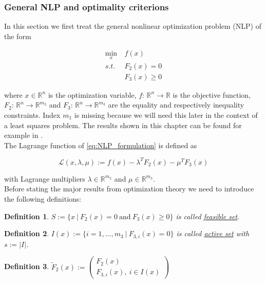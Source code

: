 \documentclass{scrartcl}[12pt, halfparskip]
\numberwithin{equation}{section}
\numberwithin{figure}{section}
\numberwithin{table}{section}
\newtheorem{Definition}{Definition}
\begin{document}
\subsubsection{General NLP and optimality criterions}
\label{sec:optimization_theory_NLP}
In this section we first treat the general nonlinear optimization problem (NLP) of the form

\begin{align}
	\min_x & \ f(x) \label{eq:NLP_formulation} \\
	s.t. & \ F_2(x) = 0 \nonumber \\
	& \ F_3(x) \ge 0 \nonumber
\end{align}

where $x \in \mathbb{R}^n$ is the optimization variable, $f\text{: } \mathbb{R}^n \rightarrow \mathbb{R}$ is the objective function, $F_2\text{: } \mathbb{R}^n \rightarrow \mathbb{R}^{m_2}$ and $F_3\text{: } \mathbb{R}^n \rightarrow \mathbb{R}^{m_3}$ are the equality and respectively inequality constraints. Index $m_1$ is missing because we will need this later in the context of a least squares problem. The results shown in this chapter can be found for example in \cite{nonlinear_optimiziation_wright}. \\

The Lagrange function of \cref{eq:NLP_formulation} is defined as

\begin{equation}
	\mathcal{L}(x,\lambda,\mu) := f(x) - \lambda^T F_2(x) - \mu^T F_3(x)
\end{equation}

with Lagrange multipliers $\lambda \in \mathbb{R}^{m_2}$ and $\mu \in \mathbb{R}^{m_3}$. \\

Before stating the major results from optimization theory we need to introduce the following definitions:

\begin{Definition}
	$S := \{ x \ | \ F_2(x) = 0 \ \text{and} \ F_3(x) \ge 0 \}$ is called \underline{feasible set}.
\end{Definition}

\begin{Definition}
	$I(x) := \{ i=1,...,m_3 \ | \ F_{3,i}(x) = 0 \}$ is called \underline{active set} with $s := \vert I \vert$.
\end{Definition}

\begin{Definition}
	$\tilde{F}_2(x) := 
	\begin{pmatrix}
		F_2(x) \\
		F_{3,i}(x), \ i \in I(x) 
	\end{pmatrix}$
\end{Definition}
\end{document}
